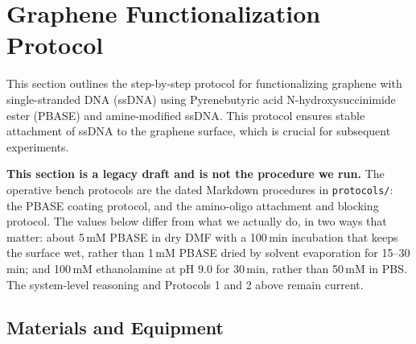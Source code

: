 \documentclass[11pt]{article}
\begin{document}
\section*{Graphene Functionalization Protocol}

This section outlines the step-by-step protocol for functionalizing graphene with single-stranded DNA (ssDNA) using Pyrenebutyric acid N-hydroxysuccinimide ester (PBASE) and amine-modified ssDNA. This protocol ensures stable attachment of ssDNA to the graphene surface, which is crucial for subsequent experiments.

\textbf{This section is a legacy draft and is not the procedure we run.}
The operative bench protocols are the dated Markdown procedures in \texttt{protocols/}: the PBASE coating protocol, and the amino-oligo attachment and blocking protocol.
The values below differ from what we actually do, in two ways that matter: about 5\,mM PBASE in dry DMF with a 100\,min incubation that keeps the surface wet, rather than 1\,mM PBASE dried by solvent evaporation for 15--30\,min; and 100\,mM ethanolamine at pH 9.0 for 30\,min, rather than 50\,mM in PBS.
The system-level reasoning and Protocols 1 and 2 above remain current.

\subsection*{Materials and Equipment}
\end{document}
